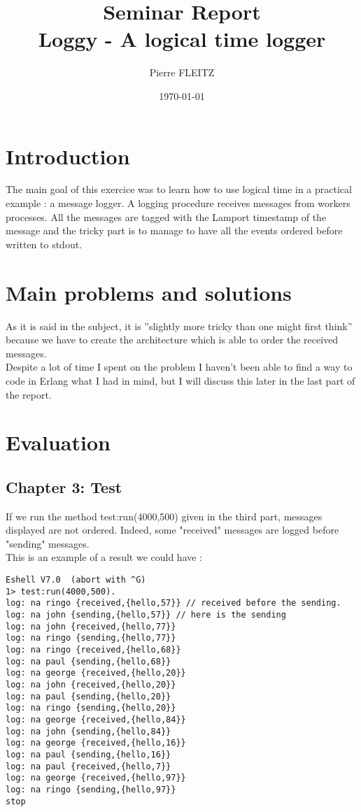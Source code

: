 \documentclass[a4paper, 11pt]{article}
\title{Seminar Report\\Loggy - A logical time logger}
\author{Pierre FLEITZ}
\date{\today{}}
\begin{document}
\maketitle

\section{Introduction}

The main goal of this exercice was to learn how to use logical time in a practical example : a message logger. A logging procedure receives messages from workers processes. All the messages are tagged with the Lamport timestamp of the message and the tricky part is to manage to have all the events ordered before written to stdout.


\section{Main problems and solutions}

As it is said in the subject, it is ”slightly more tricky than one might first think” because we have to create the architecture which is able to order the received messages.\\
Despite a lot of time I spent on the problem I haven't been able to find a way to code in Erlang what I had in mind, but I will discuss this later in the last part of the report. 

\section{Evaluation}
\subsection{Chapter 3: Test}
If we run the method test:run(4000,500) given in the third part, messages displayed are not ordered. Indeed, some "received" messages are logged before "sending" messages. \\
This is an example of a result we could have :

\begin{lstlisting}
Eshell V7.0  (abort with ^G)
1> test:run(4000,500).
log: na ringo {received,{hello,57}} // received before the sending.
log: na john {sending,{hello,57}} // here is the sending
log: na john {received,{hello,77}}
log: na ringo {sending,{hello,77}}
log: na ringo {received,{hello,68}}
log: na paul {sending,{hello,68}}
log: na george {received,{hello,20}}
log: na john {received,{hello,20}}
log: na paul {sending,{hello,20}}
log: na ringo {sending,{hello,20}}
log: na george {received,{hello,84}}
log: na john {sending,{hello,84}}
log: na george {received,{hello,16}}
log: na paul {sending,{hello,16}}
log: na paul {received,{hello,7}}
log: na george {received,{hello,97}}
log: na ringo {sending,{hello,97}}
stop
\end{lstlisting}
\end{document}
